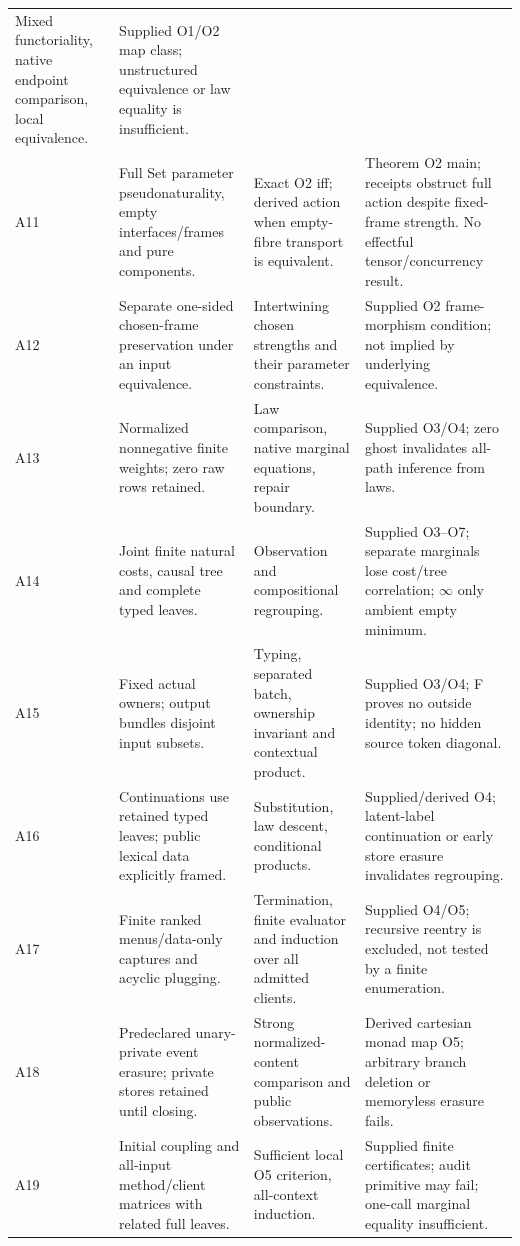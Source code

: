 \documentclass[11pt,a4paper]{article}
\theoremstyle{definition}
\begin{document}
\begin{longtable}{@{}p{.08\linewidth}p{.30\linewidth}p{.28\linewidth}p{.25\linewidth}@{}}
Mixed functoriality, native endpoint comparison, local equivalence.&Supplied
O1/O2 map class; unstructured equivalence or law equality is insufficient.\\
A11&Full Set parameter pseudonaturality, empty interfaces/frames and pure
components.&Exact O2 iff; derived action when empty-fibre transport is
equivalent.&Theorem O2 main; receipts obstruct full action despite fixed-frame
strength. No effectful tensor/concurrency result.\\
A12&Separate one-sided chosen-frame preservation under an input equivalence.&
Intertwining chosen strengths and their parameter constraints.&Supplied O2
frame-morphism condition; not implied by underlying equivalence.\\
A13&Normalized nonnegative finite weights; zero raw rows retained.&Law
comparison, native marginal equations, repair boundary.&Supplied O3/O4;
zero ghost invalidates all-path inference from laws.\\
A14&Joint finite natural costs, causal tree and complete typed leaves.&
Observation and compositional regrouping.&Supplied O3--O7; separate marginals
lose cost/tree correlation; \(\infty\) only ambient empty minimum.\\
A15&Fixed actual owners; output bundles disjoint input subsets.&Typing,
separated batch, ownership invariant and contextual product.&Supplied O3/O4;
F proves no outside identity; no hidden source token diagonal.\\
A16&Continuations use retained typed leaves; public lexical data explicitly
framed.&Substitution, law descent, conditional products.&Supplied/derived O4;
latent-label continuation or early store erasure invalidates regrouping.\\
A17&Finite ranked menus/data-only captures and acyclic plugging.&Termination,
finite evaluator and induction over all admitted clients.&Supplied O4/O5;
recursive reentry is excluded, not tested by a finite enumeration.\\
A18&Predeclared unary-private event erasure; private stores retained until
closing.&Strong normalized-content comparison and public observations.&Derived
cartesian monad map O5; arbitrary branch deletion or memoryless erasure fails.\\
A19&Initial coupling and all-input method/client matrices with related full
leaves.&Sufficient local O5 criterion, all-context induction.&Supplied finite
certificates; audit primitive may fail; one-call marginal equality insufficient.\\

\end{longtable}
\end{document}
